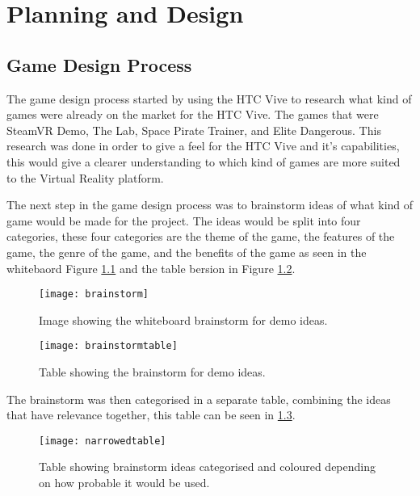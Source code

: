 \chapter{Planning and Design}
\label{chapter5}

\section{Game Design Process}
The game design process started by using the HTC Vive to research what kind of games were already on the market for the HTC Vive. The games that were SteamVR Demo\cite{steamvr}, The Lab\cite{thelab}, Space Pirate Trainer\cite{spacepiratetrainer}, and Elite Dangerous\cite{elitedangerous}. This research was done in order to give a feel for the HTC Vive and it's capabilities, this would give a clearer understanding to which kind of games are more suited to the Virtual Reality platform.
\newline
\par
The next step in the game design process was to brainstorm ideas of what kind of game would be made for the project. The ideas would be split into four categories, these four categories are the theme of the game, the features of the game, the genre of the game, and the benefits of the game as seen in the whitebaord Figure \ref{fig:brainstorm} and the table bersion in Figure \ref{fig:brainstormtable}.

\begin{figure}[H]
	\texttt{[image: brainstorm]}
	\centering
	\caption{Image showing the whiteboard brainstorm for demo ideas.}
	\label{fig:brainstorm}
\end{figure}

\begin{figure}[ht]
	\texttt{[image: brainstormtable]}
	\centering
	\caption{Table showing the brainstorm for demo ideas.}
	\label{fig:brainstormtable}
\end{figure}

\clearpage
The brainstorm was then categorised in a separate table, combining the ideas that have relevance together, this table can be seen in \ref{fig:narrowedtable}.

\begin{figure}[H]
	\texttt{[image: narrowedtable]}
	\centering
	\caption{Table showing brainstorm ideas categorised and coloured depending on how probable it would be used.}
	\label{fig:narrowedtable}
\end{figure}

